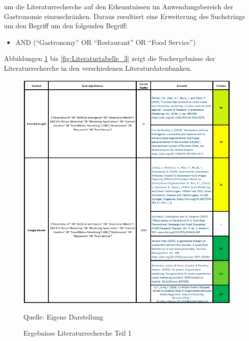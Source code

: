 um die Literaturrecherche auf den Erkenntnissen im Anwendungsbereich der Gastronomie einzuschränken.
Daraus resultiert eine Erweiterung des Suchstrings um den Begriff um den folgenden Begriff:

\begin{itemize}
    \item AND (``Gastronomy'' OR ``Restaurant'' OR ``Food Service'')
\end{itemize}

Abbildungen \ref{fig:Literaturtabelle_1} bis \ref{fig:Literaturtabelle_3} zeigt die Suchergebnisse der Literaturrecherche in den verschiedenen Literaturdatenbanken.

\begin{figure}[htbp]
    \centering
    \includegraphics[width=\textwidth]{abbildungen/Literaturtabelle_1}
    \caption{Ergebnisse Literaturrecherche Teil 1}
    \label{fig:Literaturtabelle_1}
    \raggedright Quelle: Eigene Darstellung
\end{figure}


